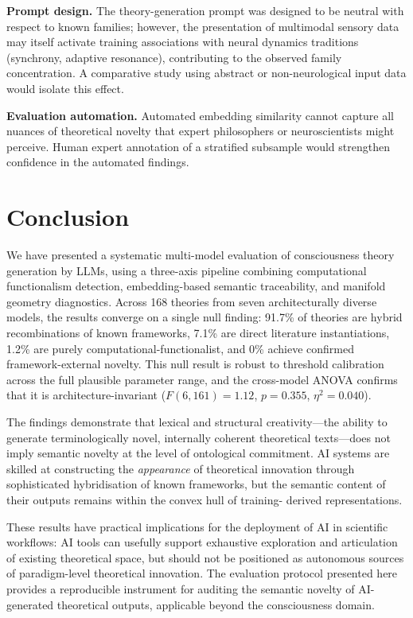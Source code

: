 \documentclass[pdflatex,sn-mathphys-num]{sn-jnl}
\begin{document}
\textbf{Prompt design.}
The theory-generation prompt was designed to be neutral with respect to known
families; however, the presentation of multimodal sensory data may itself
activate training associations with neural dynamics traditions (synchrony,
adaptive resonance), contributing to the observed family concentration.  A
comparative study using abstract or non-neurological input data would isolate
this effect.

\textbf{Evaluation automation.}
Automated embedding similarity cannot capture all nuances of theoretical novelty
that expert philosophers or neuroscientists might perceive.  Human expert
annotation of a stratified subsample would strengthen confidence in the
automated findings.

\section{Conclusion}
\label{sec:conclusion}

We have presented a systematic multi-model evaluation of consciousness theory
generation by LLMs, using a three-axis pipeline combining computational
functionalism detection, embedding-based semantic traceability, and manifold
geometry diagnostics.  Across 168 theories from seven architecturally diverse
models, the results converge on a single null finding: 91.7\% of theories are
hybrid recombinations of known frameworks, 7.1\% are direct literature
instantiations, 1.2\% are purely computational-functionalist, and 0\% achieve
confirmed framework-external novelty.  This null result is robust to threshold
calibration across the full plausible parameter range, and the cross-model ANOVA
confirms that it is architecture-invariant ($F(6,161)=1.12$, $p=0.355$,
$\eta^2=0.040$).

The findings demonstrate that lexical and structural creativity---the ability
to generate terminologically novel, internally coherent theoretical
texts---does not imply semantic novelty at the level of ontological commitment.
AI systems are skilled at constructing the \emph{appearance} of theoretical
innovation through sophisticated hybridisation of known frameworks, but the
semantic content of their outputs remains within the convex hull of training-
derived representations.

These results have practical implications for the deployment of AI in scientific
workflows: AI tools can usefully support exhaustive exploration and articulation
of existing theoretical space, but should not be positioned as autonomous sources
of paradigm-level theoretical innovation.  The evaluation protocol presented here
provides a reproducible instrument for auditing the semantic novelty of AI-
generated theoretical outputs, applicable beyond the consciousness domain.
\end{document}
